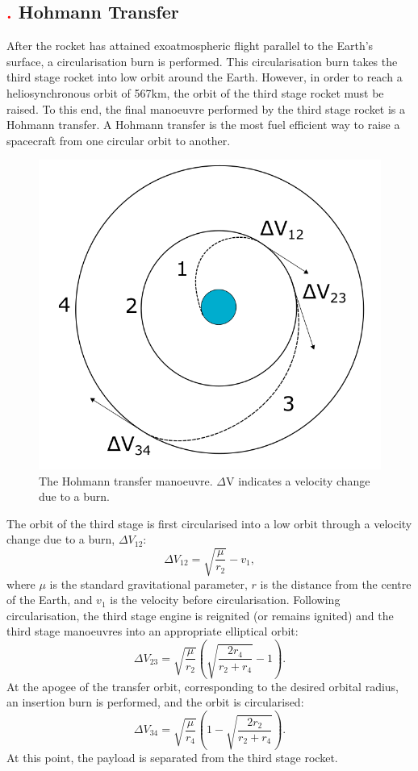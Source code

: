 \subsection{\textcolor{red}{.} Hohmann Transfer}
After the rocket has attained exoatmospheric flight parallel to the Earth's surface, a circularisation burn is performed. This circularisation burn takes the third stage rocket into low orbit around the Earth. 
However, in order to reach a heliosynchronous orbit of 567km, the orbit of the third stage rocket must be raised. 
To this end, the final manoeuvre performed by the third stage rocket is a Hohmann transfer. A Hohmann transfer is the most fuel efficient way to raise a spacecraft from one circular orbit to another\cite{hohmann}. 
\begin{figure}
\centering
\includegraphics[width=0.7\linewidth]{figures/4_LODESTAR/Hohmann}
\caption{The Hohmann transfer manoeuvre. $\Delta$V indicates a velocity change due to a burn.}
\label{fig:Hohmann}
\end{figure}
The orbit of the third stage is first circularised into a low orbit through a velocity change due to a burn, $\Delta V_{12}$:
\begin{equation}
\Delta V_{12} = \sqrt{\dfrac{\mu}{r_2}} - v_1,
\end{equation}
where $\mu$ is the standard gravitational parameter, $r$ is the distance from the centre of the Earth, and $v_1$ is the velocity before circularisation. Following circularisation, the third stage engine is reignited (or remains ignited) and the third stage manoeuvres into an appropriate elliptical orbit: 
\begin{equation}
\Delta V_{23} = \sqrt{\dfrac{\mu}{r_2}} \left( \sqrt{\dfrac{2r_4}{r_2 + r_4}} -1 \right).
\end{equation}
At the apogee of the transfer orbit, corresponding to the desired orbital radius, an insertion burn is performed, and the orbit is circularised:
\begin{equation}
\Delta V_{34} = \sqrt{\dfrac{\mu}{r_4}} \left(1- \sqrt{\dfrac{2r_2}{r_2 + r_4}}  \right).
\end{equation}
At this point, the payload is separated from the third stage rocket. 

